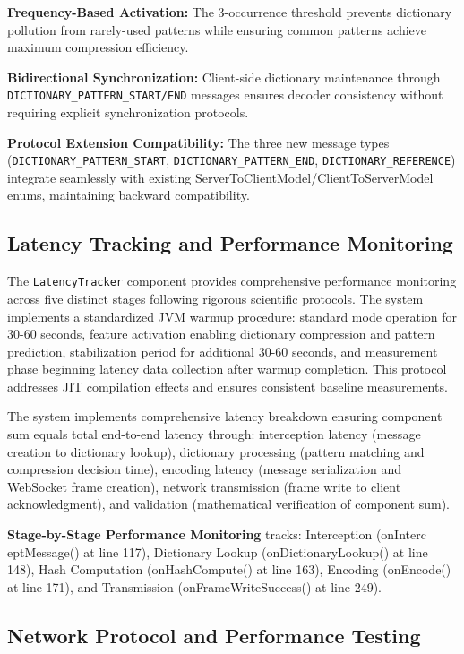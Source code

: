 \documentclass[12pt,a4paper]{article}
\begin{document}
\textbf{Frequency-Based Activation:} The 3-occurrence threshold prevents dictionary pollution from rarely-used patterns while ensuring common patterns achieve maximum compression efficiency.

\textbf{Bidirectional Synchronization:} Client-side dictionary maintenance through \texttt{DICTIONARY\_PATTERN\_START/END} messages ensures decoder consistency without requiring explicit synchronization protocols.

\textbf{Protocol Extension Compatibility:} The three new message types (\texttt{DICTIONARY\_PATTERN\_START}, \texttt{DICTIONARY\_PATTERN\_END}, \texttt{DICTIONARY\_REFERENCE}) integrate seamlessly with existing ServerToClientModel/ClientToServerModel enums, maintaining backward compatibility.

\subsection{Latency Tracking and Performance Monitoring}

The \texttt{LatencyTracker} component provides comprehensive performance monitoring across five distinct stages following rigorous scientific protocols. The system implements a standardized JVM warmup procedure: standard mode operation for 30-60 seconds, feature activation enabling dictionary compression and pattern prediction, stabilization period for additional 30-60 seconds, and measurement phase beginning latency data collection after warmup completion. This protocol addresses JIT compilation effects and ensures consistent baseline measurements.

The system implements comprehensive latency breakdown ensuring component sum equals total end-to-end latency through: interception latency (message creation to dictionary lookup), dictionary processing (pattern matching and compression decision time), encoding latency (message serialization and WebSocket frame creation), network transmission (frame write to client acknowledgment), and validation (mathematical verification of component sum).

\textbf{Stage-by-Stage Performance Monitoring} tracks: Interception (onInterc   eptMessage() at line 117), Dictionary Lookup (onDictionaryLookup() at line 148), Hash Computation (onHashCompute() at line 163), Encoding (onEncode() at line 171), and Transmission (onFrameWriteSuccess() at line 249).

\subsection{Network Protocol and Performance Testing}
\end{document}
